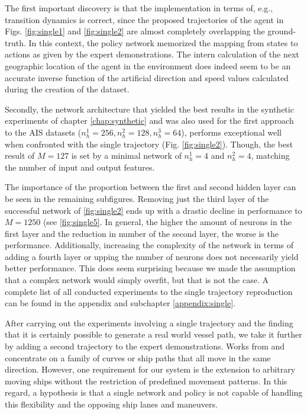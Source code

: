 The first important discovery is that the implementation in terms of, e.g., transition dynamics is correct, since the proposed trajectories of the agent in Figs. \ref{fig:single1} and \ref{fig:single2} are almost completely overlapping the ground-truth. In this context, the policy network memorized the mapping from states to actions as given by the expert demonstrations. The intern calculation of the next geographic location of the agent in the environment does indeed seem to be an accurate inverse function of the artificial direction and speed values calculated during the creation of the dataset.
\par
Secondly, the network architecture that yielded the best results in the synthetic experiments of chapter \ref{chap:synthetic} and was also used for the first approach to the AIS datasets ($n_h^1=256, n_h^2=128, n_h^3=64$), performs exceptional well when confronted with the single trajectory (Fig. \ref{fig:single2}). Though, the best result of $M=127$ is set by a minimal network of $n_h^1=4$ and $n_h^2=4$, matching the number of input and output features.
\par
The importance of the proportion between the first and second hidden layer can be seen in the remaining subfigures. Removing just the third layer of the successful network of \ref{fig:single2} ends up with a drastic decline in performance to $M=1250$ (see \ref{fig:single5}. In general, the higher the amount of neurons in the first layer and the reduction in number of the second layer, the worse is the performance. Additionally, increasing the complexity of the network in terms of adding a fourth layer or upping the number of neurons does not necessarily yield better performance. This does seem surprising because we made the assumption that a complex network would simply overfit, but that is not the case. A complete list of all conducted experiments to the single trajectory reproduction can be found in the appendix and subchapter \ref{appendix:single}.
\par
After carrying out the experiments involving a single trajectory and the finding that it is certainly possible to generate a real world vessel path, we take it further by adding a second trajectory to the expert demonstrations. Works from \cite{edgardo} and \cite{martinsen2018curved} concentrate on a family of curves or ship paths that all move in the same direction. However, one requirement for our system is the extension to arbitrary moving ships without the restriction of predefined movement patterns. In this regard, a hypothesis is that a single network and policy is not capable of handling this flexibility and the opposing ship lanes and maneuvers.
